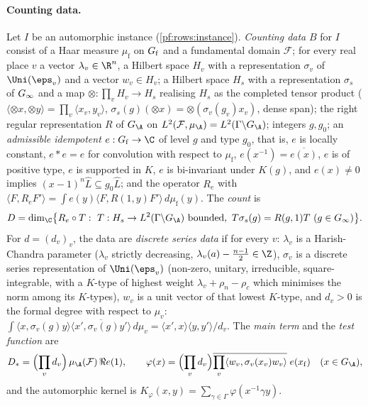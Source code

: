 \paragraph{Counting data.}
Let $I$ be an automorphic instance (\cref{pf:rows:instance}). \emph{Counting data} $B$ for $I$ consist of a Haar measure
$\mu_{\mathrm f}$ on $G_{\mathrm f}$ and a fundamental domain $\mathcal F$; for every real place $v$ a vector $\lambda_v\in\R^n$, a
Hilbert space $H_v$ with a representation $\sigma_v$ of $\Uni(\eps_v)$ and a vector $w_v\in H_v$; a Hilbert space $H_s$
with a representation $\sigma_s$ of $G_\infty$ and a map $\otimes:\prod_vH_v\to H_s$ realising $H_s$ as the completed
tensor product ($\langle\otimes x,\otimes y\rangle=\prod_v\langle x_v,y_v\rangle$, $\sigma_s(g)(\otimes x)=\otimes(\sigma_v(g_v)x_v)$,
dense span); the right regular representation $R$ of $\rowsGA$ on $L^2(\mathcal F,\mu_{\A})=L^2(\Gamma\backslash\rowsGA)$;
integers $g,g_0$; an \emph{admissible idempotent} $e:\rowsGf\to\C$ of level $g$ and type $g_0$, that is, $e$ is locally
constant, $e*e=e$ for convolution with respect to $\mu_{\mathrm f}$, $e(x^{-1})=\overline{e(x)}$, $e$ is of positive type,
$e$ is supported in $K$, $e$ is bi-invariant under $K(g)$, and $e(x)\ne0$ implies $(x-1)^n\hat L\subseteq g_0\hat L$; and the
operator $R_e$ with $\langle F,R_eF'\rangle=\int e(y)\langle F,R(1,y)F'\rangle\,d\mu_{\mathrm f}(y)$. The \emph{count} is
\[
\rowsDc=\dim_\C\bigl\{R_e\circ T:\ T:H_s\to L^2(\Gamma\backslash\rowsGA)\text{ bounded},\ T\sigma_s(g)=R(g,1)T\ (g\in\rowsGinf)\bigr\}.
\]
For $d=(d_v)_v$, the data are \emph{discrete series data} if for every $v$: $\lambda_v$ is a Harish-Chandra parameter
($\lambda_v$ strictly decreasing, $\lambda_v(a)-\frac{n-1}2\in\Z$), $\sigma_v$ is a discrete series representation of
$\Uni(\eps_v)$ (non-zero, unitary, irreducible, square-integrable, with a $K$-type of highest weight
$\lambda_v+\rho_n-\rho_c$ which minimises the norm among its $K$-types), $w_v$ is a unit vector of that lowest $K$-type,
and $d_v>0$ is the formal degree with respect to $\mu_v$:
$\int\langle x,\sigma_v(g)y\rangle\overline{\langle x',\sigma_v(g)y'\rangle}\,d\mu_v=\langle x',x\rangle\langle y,y'\rangle/d_v$.
The \emph{main term} and the \emph{test function} are
\[
\rowsDst=\Bigl(\prod_vd_v\Bigr)\,\mu_{\A}(\mathcal F)\,\Re e(1),\qquad
\varphi(x)=\Bigl(\prod_vd_v\Bigr)\overline{\prod_v\langle w_v,\sigma_v(x_v)w_v\rangle}\;e(x_{\mathrm f})\quad(x\in\rowsGA),
\]
and the automorphic kernel is $K_\varphi(x,y)=\sum_{\gamma\in\Gamma}\varphi(x^{-1}\gamma y)$.

